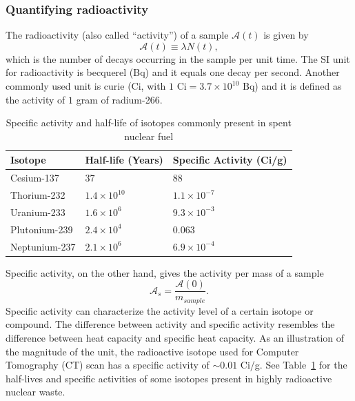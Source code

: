 \documentclass[nofootinbib,preprint,aps]{revtex4-1}
\begin{document}
        \subsubsection{Quantifying radioactivity}
        The radioactivity (also called ``activity'') of a sample $\mathcal{A}(t)$ is given by
        \begin{equation}
            \label{eq:act}
            \mathcal{A}(t)\equiv \lambda N(t),
        \end{equation}
        which is the number of decays occurring in the sample per unit time. The SI
        unit for radioactivity is becquerel (Bq) and it equals one decay per second. Another commonly used
        unit is curie (Ci, with $1\text{ Ci}=3.7\times 10^{10}\text{ Bq}$) and it is defined as
        the activity of $1$ gram of radium-266.
        \begin{table}
            \centering
            \caption{Specific activity and half-life of isotopes commonly present in spent nuclear fuel \cite{toi}}
            \begin{ruledtabular}
                \begin{tabular}{l l l}
                Isotope & Half-life (Years) & Specific Activity (Ci/g)\\
                \hline
                Cesium-137 & $37$ & $88$\\
                Thorium-232 & $1.4 \times 10^{10}$ & $1.1\times 10^{-7}$\\
                Uranium-233 & $1.6\times 10^6$ & $9.3\times 10^{-3}$\\
                Plutonium-239 & $2.4\times 10^4$ & $0.063$\\
                Neptunium-237 & $2.1\times 10^6$ & $6.9\times 10^{-4}$\\
            \end{tabular}
            \label{tab:hl}
            \end{ruledtabular}
        \end{table}

        Specific activity, on the other hand, gives the activity per mass of a sample
        \begin{equation}
        \mathcal{A}_s = \frac{\mathcal{A}(0)}{{m_{sample}}}.
        \end{equation}
        Specific activity can characterize the activity level of a certain isotope or compound.
        The difference between
        activity and specific activity resembles the difference between heat capacity and specific heat
        capacity.
        As an illustration of the magnitude of the unit,
        the radioactive isotope used for Computer Tomography (CT) scan has a specific activity
        of $\sim 0.01$ Ci/g. See Table~\ref{tab:hl} for the half-lives and specific activities
        of some isotopes present in highly radioactive nuclear waste.
\end{document}
